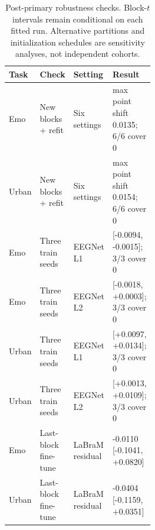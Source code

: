 \begin{table}[ht]\centering\small
\caption{Post-primary robustness checks. Block-$t$ intervals remain conditional on each fitted run. Alternative partitions and initialization schedules are sensitivity analyses, not independent cohorts.}
\begin{tabularx}{\linewidth}{p{0.09\linewidth}p{0.22\linewidth}p{0.18\linewidth}X}\toprule
Task & Check & Setting & Result\\\midrule
Emo & New blocks + refit & Six settings & max point shift 0.0135; 6/6 cover 0\\
Urban & New blocks + refit & Six settings & max point shift 0.0154; 6/6 cover 0\\
Emo & Three train seeds & EEGNet L1 & [-0.0094, -0.0015]; 3/3 cover 0\\
Emo & Three train seeds & EEGNet L2 & [-0.0018, +0.0003]; 3/3 cover 0\\
Urban & Three train seeds & EEGNet L1 & [+0.0097, +0.0134]; 3/3 cover 0\\
Urban & Three train seeds & EEGNet L2 & [+0.0013, +0.0109]; 3/3 cover 0\\
Emo & Last-block fine-tune & LaBraM residual & -0.0110 [-0.1041, +0.0820]\\
Urban & Last-block fine-tune & LaBraM residual & -0.0404 [-0.1159, +0.0351]\\
\bottomrule\end{tabularx}
\end{table}
